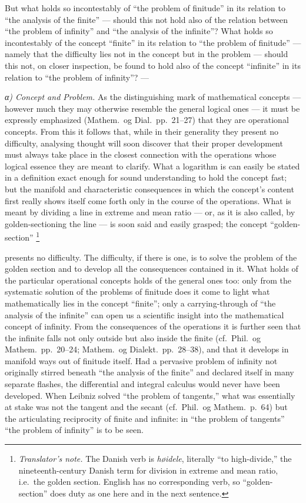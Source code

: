 \documentclass[12pt,a4paper]{book}
\renewcommand{\thefootnote}{\ifcase\value{footnote}\or *)\or **)\or ***)\fi}
\newcommand{\tnote}[1]{%
  \begingroup
  \renewcommand{\thefootnote}{\textdagger}%
  \footnote{\emph{Translator's note.} #1}%
  \addtocounter{footnote}{-1}%
  \endgroup}
\begin{document}
But what holds so incontestably of ``the problem of finitude'' in its relation
to ``the analysis of the finite'' --- should this not hold also of the relation
between ``the problem of infinity'' and ``the analysis of the infinite''? What
holds so incontestably of the concept ``finite'' in its relation to ``the
problem of finitude'' --- namely that the difficulty lies not in the concept
but in the problem --- should this not, on closer inspection, be found to hold
also of the concept
``infinite'' in its relation to ``the problem of infinity''? ---

\emph{α) Concept and Problem.} As the distinguishing mark of mathematical
concepts --- however much they may otherwise resemble the general logical ones
--- it must be expressly emphasized (Mathem.\ og Dial.\ pp.~21--27) that they
are operational concepts. From this it follows that, while in their generality
they present no difficulty, analysing thought will soon discover that their
proper development must always take place in the closest connection with the
operations whose logical essence they are meant to clarify. What a logarithm is
can easily be stated in a definition exact enough for sound understanding to
hold the concept fast; but the manifold and characteristic consequences in
which the concept's content first really
shows itself come forth only in the course of the operations. What is meant by
dividing a line in extreme and mean ratio --- or, as it is also called, by
golden-sectioning the line --- is soon said and easily grasped; the concept
``golden-section''\tnote{The Danish verb is \emph{høidele}, literally ``to
high-divide,'' the nineteenth-century Danish term for division in extreme and
mean ratio, i.e.\ the golden section. English has no corresponding verb, so
``golden-section'' does duty as one here and in the next sentence.} presents no
difficulty. The difficulty, if there is one, is to solve the problem of the
golden section and to develop all the consequences contained in it. What holds
of the particular operational concepts holds of the general ones too: only from
the systematic solution of the problems of finitude does it come to light what
mathematically lies in the concept ``finite''; only a carrying-through of ``the
analysis of the infinite'' can open us a scientific insight into the
mathematical concept of infinity. From the consequences of the operations it is
further seen that the infinite falls not only outside but also inside the
finite (cf.\ Phil.\ og Mathem.\ pp.~20--24; Mathem.\ og Dialekt.\ pp.~28--38),
and that it develops in manifold ways out of finitude itself. Had a pervasive
problem of infinity not originally stirred beneath ``the analysis of the
finite'' and declared itself in many separate flashes, the differential and
integral calculus would never have been developed. When Leibniz solved ``the
problem of tangents,'' what was essentially at stake was not the tangent and
the secant (cf.\ Phil.\ og Mathem.\ p.~64) but the articulating reciprocity of
finite and infinite: in ``the problem of tangents'' ``the problem of infinity''
is to be seen.
\end{document}

